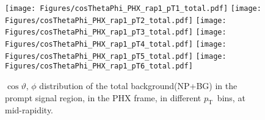 \documentclass[12pt]{article}
\newcommand{\pt}{$p_{\mathrm{T}}$}
\begin{document}
%
%


\begin{figure}[htbp]
\centering
\texttt{[image: Figures/cosThetaPhi\_PHX\_rap1\_pT1\_total.pdf]}
\texttt{[image: Figures/cosThetaPhi\_PHX\_rap1\_pT2\_total.pdf]}
\texttt{[image: Figures/cosThetaPhi\_PHX\_rap1\_pT3\_total.pdf]}
\texttt{[image: Figures/cosThetaPhi\_PHX\_rap1\_pT4\_total.pdf]}
\texttt{[image: Figures/cosThetaPhi\_PHX\_rap1\_pT5\_total.pdf]}
\texttt{[image: Figures/cosThetaPhi\_PHX\_rap1\_pT6\_total.pdf]}
\caption{$\cos\vartheta,\,\phi$ distribution of the total background(NP+BG) in the prompt signal region, 
	in the PHX frame, in different \pt\ bins, at mid-rapidity.}
\end{figure}
\clearpage
\end{document}

